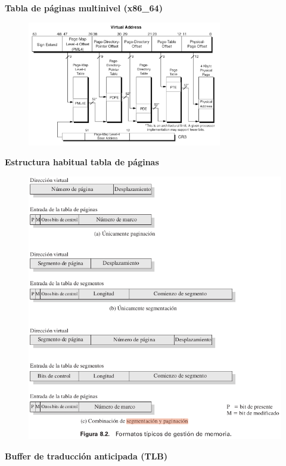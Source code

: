 \documentclass{article}
\begin{document}
\textbf{Tabla de páginas multinivel (x86\_64)}
\begin{figure}[h]
\centering
\includegraphics[scale=1,width=85mm]{tabla_multinivel.png}
\end{figure}

\newpage

\textbf{Estructura habitual tabla de páginas}
\begin{figure}[h]
\centering
\includegraphics[scale=1,width=\textwidth]{estructuratabla.png}
\end{figure}

\textbf{Buffer de traducción anticipada (TLB)}
\end{document}
